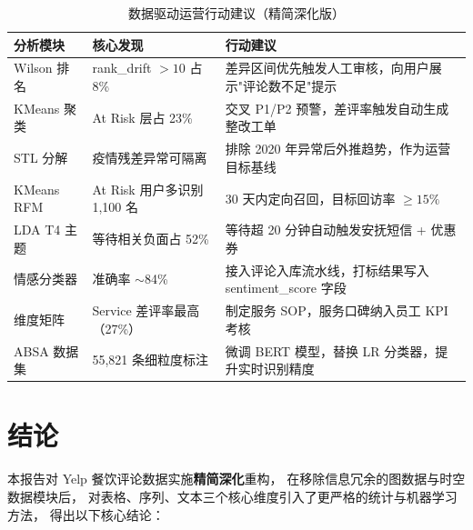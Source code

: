 \documentclass[12pt, a4paper]{article}
\begin{document}
\begin{table}[H]
\centering
\caption{数据驱动运营行动建议（精简深化版）}
\label{tab:action}
\begin{tabularx}{\textwidth}{l l X}
\toprule
\textbf{分析模块} & \textbf{核心发现} & \textbf{行动建议} \\
\midrule
Wilson 排名  & rank\_drift $> 10$ 占 8\%   & 差异区间优先触发人工审核，向用户展示"评论数不足"提示 \\
KMeans 聚类  & At Risk 层占 23\%             & 交叉 P1/P2 预警，差评率触发自动生成整改工单 \\
STL 分解     & 疫情残差异常可隔离            & 排除 2020 年异常后外推趋势，作为运营目标基线 \\
KMeans RFM   & At Risk 用户多识别 1,100 名   & 30 天内定向召回，目标回访率 $\geq 15\%$ \\
LDA T4 主题  & 等待相关负面占 52\%           & 等待超 20 分钟自动触发安抚短信 + 优惠券 \\
情感分类器   & 准确率 $\sim$84\%             & 接入评论入库流水线，打标结果写入 sentiment\_score 字段 \\
维度矩阵     & Service 差评率最高（27\%）    & 制定服务 SOP，服务口碑纳入员工 KPI 考核 \\
ABSA 数据集  & 55,821 条细粒度标注           & 微调 BERT 模型，替换 LR 分类器，提升实时识别精度 \\
\bottomrule
\end{tabularx}
\end{table}

\section{结论}

本报告对 Yelp 餐饮评论数据实施\textbf{精简深化}重构，
在移除信息冗余的图数据与时空数据模块后，
对表格、序列、文本三个核心维度引入了更严格的统计与机器学习方法，
得出以下核心结论：
\end{document}
